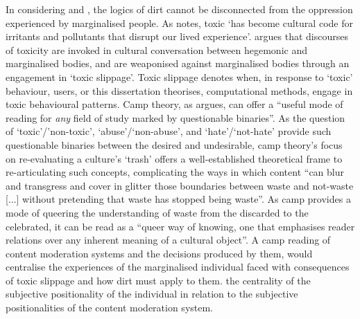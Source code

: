 In considering \citet{Hall:1997} and \citet{Lepawsky:2019}, the logics of dirt cannot be disconnected from the oppression experienced by marginalised people.
As \citet{Risam:2015} notes, toxic `has become cultural code for irritants and pollutants that disrupt our lived experience'.
\citet{Risam:2015} argues that discourses of toxicity are invoked in cultural conversation between hegemonic and marginalised bodies, and are weaponised against marginalised bodies through an engagement in `toxic slippage'.
Toxic slippage denotes when, in response to `toxic' behaviour, users, or this dissertation theorises, computational methods, engage in toxic behavioural patterns.
Camp theory, as \citet{Schaffer:2015} argues, can offer a ``useful mode of reading for \textit{any} field of study marked by questionable binaries''.
As the question of `toxic'/'non-toxic', `abuse'/`non-abuse', and `hate'/`not-hate' provide such questionable binaries between the desired and undesirable, camp theory's focus on re-evaluating a culture's `trash' offers a well-established theoretical frame to re-articulating such concepts, complicating the ways in which content ``can blur and transgress and cover in glitter those boundaries between waste and not-waste [...] without pretending that waste has stopped being waste''\citep{Schaffer:2015}.
As camp provides a mode of queering the understanding of waste from the discarded to the celebrated, it can be read as a ``queer way of knowing, one that emphasises reader relations over any inherent meaning of a cultural object''.
A camp reading of content moderation systems and the decisions produced by them, would centralise the experiences of the marginalised individual faced with consequences of toxic slippage and how dirt must apply to them.
 the centrality of the subjective positionality of the individual in relation to the subjective positionalities of the content moderation system.

